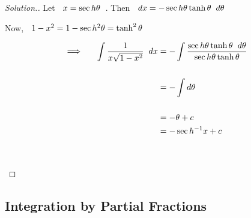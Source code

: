 \documentclass[11pt,a4paper]{article}
\theoremstyle{definition}
\newenvironment{solution}
  {\renewcommand{\qedsymbol}{}\begin{proof}[\textit{Solution}.]}
  {\end{proof}}
\begin{document}
\begin{solution}


Let $\hspace{0.2cm} x = \sec h\theta\hspace{0.2cm}$. Then $\hspace{0.2cm} dx = -\sec h\theta \tanh\theta \hspace{0.2cm}d\theta$


Now, $\hspace{0.2cm} 1 - x^2 = 1 - \sec h^2\theta = \tanh^2\theta$

\begin{align*}
\implies \hspace{0.5cm} \int \dfrac{1}{x\sqrt{1 - x^2}}\hspace{0.2cm}dx & = - \int \dfrac{\sec h\theta \tanh\theta\hspace{0.2cm}d\theta}{\sec h\theta \tanh\theta}\\\\
& = -\int d\theta\\\\
& = -\theta + c\\
& = -\sec h^{-1} x + c\\\\\\
\end{align*}
\end{solution}

\subsection{Integration by Partial Fractions}
\end{document}
